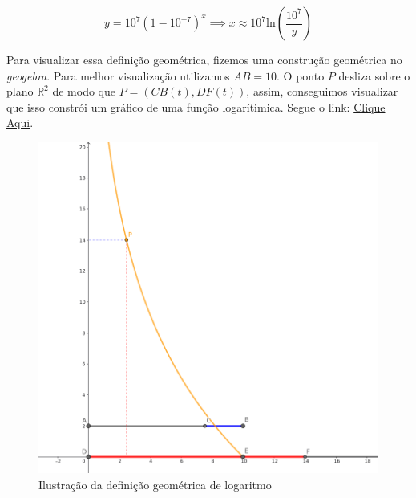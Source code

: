 \[
y = 10^7 (1-10^{-7})^{x} \implies x \approx 10^7 \text{ln}\left(\frac{10^7}{y}\right)
\]

Para visualizar essa definição geométrica, fizemos uma construção geométrica no \textit{geogebra}. Para melhor visualização utilizamos $AB = 10$. O ponto $P$ desliza sobre o plano $\mathbb{R}^2$ de modo que $P = (CB(t), DF(t))$, assim, conseguimos visualizar que isso constrói um gráfico de uma função logarítimica. Segue o link: 
\href{https://www.geogebra.org/classic/hjcec98z}{Clique Aqui}.

\begin{figure}[H]
    \centering
    \includegraphics[width=0.9\linewidth]{img/defgeogebra.png}
    \caption{Ilustração da definição geométrica de logaritmo}
\end{figure}

